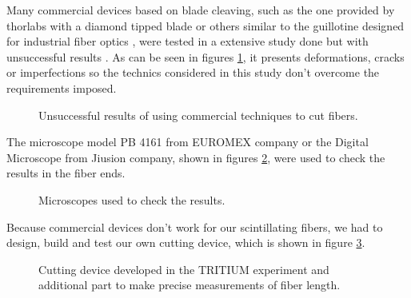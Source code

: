 Many commercial devices based on blade cleaving, such as the one provided by thorlabs with a diamond tipped blade \cite{DiamondThorlabs} or others similar to the guillotine designed for industrial fiber optics \cite{GuillotineIFO}, were tested in a extensive study done but with unsuccessful results \cite{TFGAlberto}. As can be seen in figures \ref{fig:BadCutsOfFibers}, it presents deformations, cracks or imperfections so the technics considered in this study don't overcome the requirements imposed.

\begin{figure}[htbp]
 \centering
 \caption{Unsuccessful results of using commercial techniques to cut fibers.}
 \label{fig:BadCutsOfFibers}
\end{figure}

The microscope model PB 4161 from EUROMEX company or the Digital Microscope from Jiusion company, shown in figures \ref{fig:Microscopes}, were used to check the results in the fiber ends.

\begin{figure}[htbp]
 \centering
 \caption{Microscopes used to check the results.}
 \label{fig:Microscopes}
\end{figure}

Because commercial devices don't work for our scintillating fibers, we had to design, build and test our own cutting device, which is shown in figure \ref{fig:CuttingTRITIUMDevice}.

\begin{figure}[htbp]
 \centering
    \newline
 \caption{Cutting device developed in the TRITIUM experiment and additional part to make precise measurements of fiber length.}
 \label{fig:CuttingTRITIUMDevice}
\end{figure}

